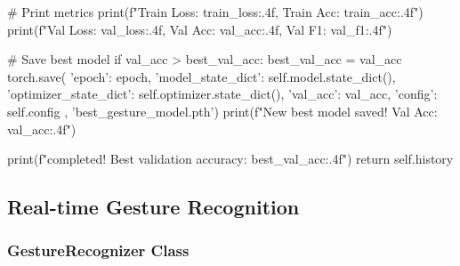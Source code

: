 \begin{aivncodebox}
\begin{python}
            # Print metrics
            print(f"Train Loss: {train_loss:.4f}, Train Acc: {train_acc:.4f}")
            print(f"Val Loss: {val_loss:.4f}, Val Acc: {val_acc:.4f}, Val F1: {val_f1:.4f}")
            
            # Save best model
            if val_acc > best_val_acc:
                best_val_acc = val_acc
                torch.save({
                    'epoch': epoch,
                    'model_state_dict': self.model.state_dict(),
                    'optimizer_state_dict': self.optimizer.state_dict(),
                    'val_acc': val_acc,
                    'config': self.config
                }, 'best_gesture_model.pth')
                print(f"New best model saved! Val Acc: {val_acc:.4f}")
        
        print(f"\nTraining completed! Best validation accuracy: {best_val_acc:.4f}")
        return self.history
\end{python}
\end{aivncodebox}

\subsection{Real-time Gesture Recognition}

\subsubsection{GestureRecognizer Class}

